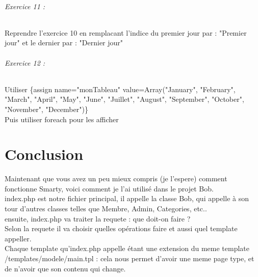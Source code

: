 \documentclass[10pt,a4paper]{article}
\begin{document}
			\paragraph{Exercice 11 :} Reprendre l'exercice 10 en remplacant l'indice du premier jour par : "Premier jour" et le dernier par : "Dernier jour"
			\paragraph{Exercice 12 :} Utiliser \{assign name="monTableau" value=Array("January", "February", "March", "April", "May", "June", "Juillet", "August", "September", "October", "November", "December")\}\\
			Puis utiliser foreach pour les afficher	
	\newpage
	\part{Conclusion}
		Maintenant que vous avez un peu mieux compris (je l'espere) comment fonctionne Smarty, voici comment je l'ai utilisé dans le projet Bob.\\
		
		index.php est notre fichier principal, il appelle la classe Bob, qui appelle à son tour d'autres classes telles que Membre, Admin, Categories, etc..\\
		ensuite, index.php va traiter la requete : que doit-on faire ?\\
		Selon la requete il va choisir quelles opérations faire et aussi quel template appeller.\\
		
		Chaque template qu'index.php appelle étant une extension du meme template /templates/modele/main.tpl : cela nous permet d'avoir une meme page type, et de n'avoir que son contenu qui change.
	
\end{document}
